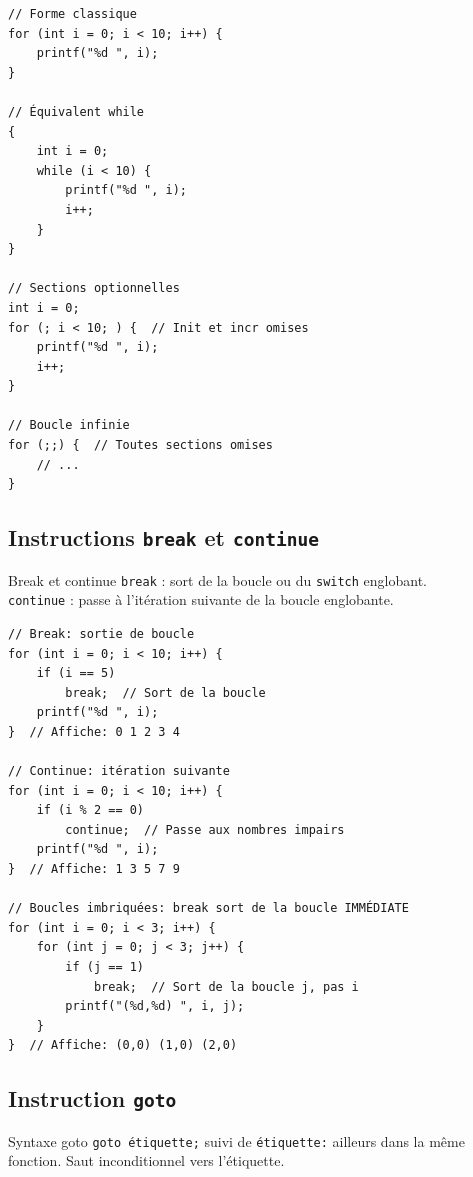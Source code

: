 \documentclass[10pt,a4paper]{article}
\begin{document}
\begin{lstlisting}[caption={For et équivalence}]
// Forme classique
for (int i = 0; i < 10; i++) {
    printf("%d ", i);
}

// Équivalent while
{
    int i = 0;
    while (i < 10) {
        printf("%d ", i);
        i++;
    }
}

// Sections optionnelles
int i = 0;
for (; i < 10; ) {  // Init et incr omises
    printf("%d ", i);
    i++;
}

// Boucle infinie
for (;;) {  // Toutes sections omises
    // ...
}
\end{lstlisting}

\subsection{Instructions \texttt{break} et \texttt{continue}}

\begin{techbox}{Break et continue}
\texttt{break} : sort de la boucle ou du \texttt{switch} englobant.\\
\texttt{continue} : passe à l'itération suivante de la boucle englobante.
\end{techbox}

\begin{lstlisting}[caption={Break et continue}]
// Break: sortie de boucle
for (int i = 0; i < 10; i++) {
    if (i == 5)
        break;  // Sort de la boucle
    printf("%d ", i);
}  // Affiche: 0 1 2 3 4

// Continue: itération suivante
for (int i = 0; i < 10; i++) {
    if (i % 2 == 0)
        continue;  // Passe aux nombres impairs
    printf("%d ", i);
}  // Affiche: 1 3 5 7 9

// Boucles imbriquées: break sort de la boucle IMMÉDIATE
for (int i = 0; i < 3; i++) {
    for (int j = 0; j < 3; j++) {
        if (j == 1)
            break;  // Sort de la boucle j, pas i
        printf("(%d,%d) ", i, j);
    }
}  // Affiche: (0,0) (1,0) (2,0)
\end{lstlisting}

\subsection{Instruction \texttt{goto}}

\begin{definitionbox}{Syntaxe goto}
\texttt{goto étiquette;} suivi de \texttt{étiquette:} ailleurs dans la même fonction. Saut inconditionnel vers l'étiquette.
\end{definitionbox}
\end{document}
